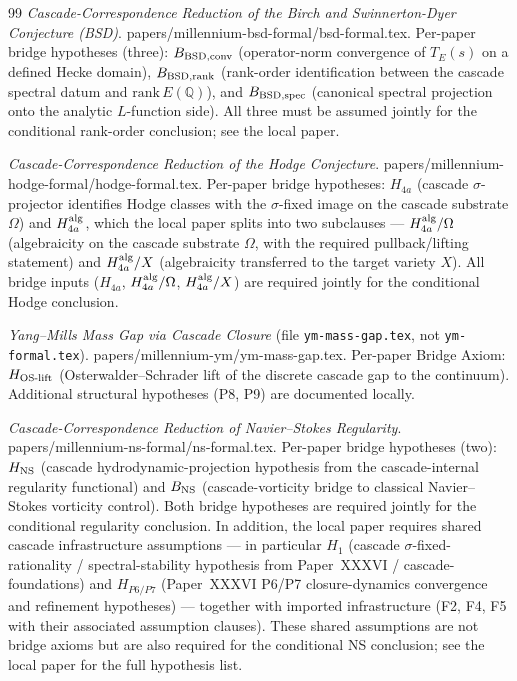 \documentclass[11pt, a4paper]{amsart}
\theoremstyle{definition}
\begin{document}
\begin{thebibliography}{99}
\emph{Cascade-Correspondence Reduction of the Birch and
Swinnerton-Dyer Conjecture (BSD)}.
papers/millennium-bsd-formal/bsd-formal.tex.  Per-paper bridge
hypotheses (three): $B_{\rm BSD,conv}$ (operator-norm convergence of
$T_E(s)$ on a defined Hecke domain), $B_{\rm BSD,rank}$ (rank-order
identification between the cascade spectral datum and
$\mathrm{rank}\,E(\mathbb{Q})$), and $B_{\rm BSD,spec}$ (canonical
spectral projection onto the analytic $L$-function side).  All three
must be assumed jointly for the conditional rank-order conclusion;
see the local paper.

\emph{Cascade-Correspondence Reduction of the Hodge Conjecture}.
papers/millennium-hodge-formal/hodge-formal.tex.  Per-paper bridge
hypotheses: $H_{4a}$ (cascade $\sigma$-projector identifies Hodge
classes with the $\sigma$-fixed image on the cascade substrate
$\Omega$) and $H_{4a}^{\rm alg}$, which the local paper splits into
two subclauses --- $H_{4a}^{\rm alg}/\Omega$ (algebraicity on the
cascade substrate $\Omega$, with the required pullback/lifting
statement) and $H_{4a}^{\rm alg}/X$ (algebraicity transferred to
the target variety $X$).  All bridge inputs ($H_{4a}$,
$H_{4a}^{\rm alg}/\Omega$, $H_{4a}^{\rm alg}/X$) are required
jointly for the conditional Hodge conclusion.

\emph{Yang--Mills Mass Gap via Cascade Closure} (file
\texttt{ym-mass-gap.tex}, not \texttt{ym-formal.tex}).
papers/millennium-ym/ym-mass-gap.tex.  Per-paper Bridge Axiom:
$H_{\rm OS\text{-}lift}$ (Osterwalder--Schrader lift of the
discrete cascade gap to the continuum).  Additional structural
hypotheses (P8, P9) are documented locally.

\emph{Cascade-Correspondence Reduction of Navier--Stokes
Regularity}.  papers/millennium-ns-formal/ns-formal.tex.
Per-paper bridge hypotheses (two): $H_{\rm NS}$ (cascade
hydrodynamic-projection hypothesis from the cascade-internal
regularity functional) and $B_{\rm NS}$ (cascade-vorticity bridge to
classical Navier--Stokes vorticity control).  Both bridge
hypotheses are required jointly for the conditional regularity
conclusion.  In addition, the local paper requires shared cascade
infrastructure assumptions --- in particular $H_1$ (cascade
$\sigma$-fixed-rationality / spectral-stability hypothesis from
Paper~XXXVI / cascade-foundations) and $H_{P6/P7}$ (Paper~XXXVI
P6/P7 closure-dynamics convergence and refinement hypotheses) ---
together with imported infrastructure (F2, F4, F5 with their
associated assumption clauses).  These shared assumptions are not
bridge axioms but are also required for the conditional NS
conclusion; see the local paper for the full hypothesis list.


\end{thebibliography}
\end{document}
